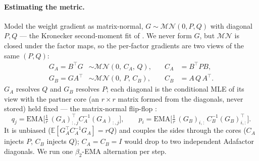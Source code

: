 \documentclass[11pt]{article}
\newcommand{\E}{\mathbb{E}}
\theoremstyle{plain}
\theoremstyle{definition}
\theoremstyle{remark}
\begin{document}
\paragraph{Estimating the metric.}
\label{par:coupling}
Model the weight gradient as matrix-normal, $G\sim\mathcal{MN}(0,P,Q)$ with diagonal $P,Q$ --- the Kronecker second-moment fit of \cite{klshampoo,soap}. We never form $G$, but $\mathcal{MN}$ is closed under the factor maps, so the per-factor gradients are two views of the same $(P,Q)$:
\begin{equation}
\begin{aligned}
  G_A=B^\top G &\sim\mathcal{MN}(0,\,C_A,\,Q), &\quad C_A&=B^\top P B,\\
  G_B=GA^\top  &\sim\mathcal{MN}(0,\,P,\,C_B), &\quad C_B&=A\,Q\,A^\top .
\end{aligned}
\label{eq:ours-closure}
\end{equation}
$G_A$ resolves $Q$ and $G_B$ resolves $P$; each diagonal is the conditional MLE of its view with the partner core (an $r\times r$ matrix formed from the diagonals, never stored) held fixed --- the matrix-normal flip-flop \cite{klshampoo,dutilleul}:
\begin{equation}
  q_j=\mathrm{EMA}\Big[\tfrac1r\,(G_A)_{:,j}^\top C_A^{-1}(G_A)_{:,j}\Big],\qquad
  p_i=\mathrm{EMA}\Big[\tfrac1r\,(G_B)_{i,:}\,C_B^{-1}(G_B)_{i,:}^\top\Big].
  \label{eq:ours-klcoupling}
\end{equation}
It is unbiased ($\E[G_A^\top C_A^{-1}G_A]=rQ$) and couples the sides through the cores ($C_A$ injects $P$, $C_B$ injects $Q$); $C_A=C_B=I$ would drop to two independent Adafactor diagonals. We run one $\beta_2$-EMA alternation per step.
\end{document}
